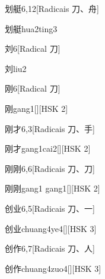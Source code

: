 \begin{entry}{划艇}{6,12}[Radicais ⼑、⾈]
  \begin{phonetics}{划艇}{hua2ting3}
  \end{phonetics}
\end{entry}

\begin{entry}{刘}{6}[Radical ⼑]
  \begin{phonetics}{刘}{liu2}
  \end{phonetics}
\end{entry}

\begin{entry}{刚}{6}[Radical ⼑]
  \begin{phonetics}{刚}{gang1}[][HSK 2]
  \end{phonetics}
\end{entry}

\begin{entry}{刚才}{6,3}[Radicais ⼑、⼿]
  \begin{phonetics}{刚才}{gang1cai2}[][HSK 2]
  \end{phonetics}
\end{entry}

\begin{entry}{刚刚}{6,6}[Radicais ⼑、⼑]
  \begin{phonetics}{刚刚}{gang1 gang1}[][HSK 2]
  \end{phonetics}
\end{entry}

\begin{entry}{创业}{6,5}[Radicais ⼑、⼀]
  \begin{phonetics}{创业}{chuang4ye4}[][HSK 3]
  \end{phonetics}
\end{entry}

\begin{entry}{创作}{6,7}[Radicais ⼑、⼈]
  \begin{phonetics}{创作}{chuang4zuo4}[][HSK 3]
  \end{phonetics}
\end{entry}


